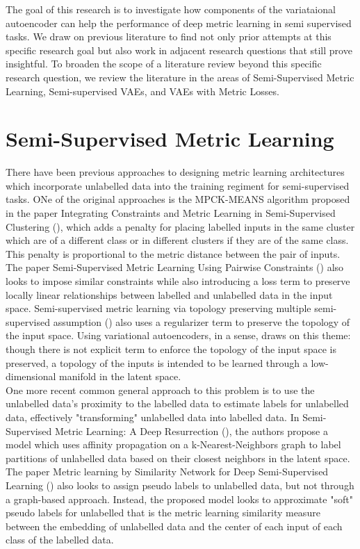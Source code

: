 \documentclass[./dissertation.tex]{subfiles}
\begin{document}

The goal of this research is to investigate how components of the variataional autoencoder can help the performance of deep metric learning in semi supervised tasks. We draw on previous literature to find not only prior attempts at this specific research goal but also work in adjacent research questions that still prove insightful. To broaden the scope of a literature review beyond this specific research question, we review the literature in the areas of Semi-Supervised Metric Learning, Semi-supervised VAEs, and VAEs with Metric Losses. 


\section{Semi-Supervised Metric Learning}
There have been previous approaches to designing metric learning architectures which incorporate unlabelled data into the training regiment for semi-supervised tasks. ONe of the original approaches is the MPCK-MEANS algorithm proposed in the paper Integrating Constraints and Metric Learning in Semi-Supervised Clustering (\cite{bilenko2004integrating}), which adds a penalty for placing labelled inputs in the same cluster which are of a different class or in different clusters if they are of the same class. This penalty is proportional to the metric distance between the pair of inputs. The paper Semi-Supervised Metric Learning Using Pairwise Constraints (\cite{baghshah2009semi}) also looks to impose similar constraints while also introducing a loss term to preserve locally linear relationships between labelled and unlabelled data in the input space. Semi-supervised metric learning via topology preserving multiple semi-supervised assumption (\cite{wang2013semi}) also uses a regularizer term to preserve the topology of the input space. Using variational autoencoders, in a sense, draws on this theme: though there is not explicit term to enforce the topology of the input space is preserved, a topology of the inputs is intended to be learned through a low-dimensional manifold in the latent space. \\


One more recent common general approach to this problem is to use the unlabelled data's proximity to the labelled data to estimate labels for unlabelled data, effectively "transforming" unlabelled data into labelled data. In Semi-Supervised Metric Learning: A Deep Resurrection (\cite{dutta2021semi}), the authors propose a model which uses affinity propagation on a k-Nearest-Neighbors graph to label partitions of unlabelled data based on their closest neighbors in the latent space. The paper Metric learning by Similarity Network for Deep Semi-Supervised Learning (\cite{wu2020metric}) also looks to assign pseudo labels to unlabelled data, but not through a graph-based approach. Instead, the proposed model looks to approximate "soft" pseudo labels for unlabelled that is the metric learning similarity measure between the embedding of unlabelled data and the center of each input of each class of the labelled data. \\
\end{document}
